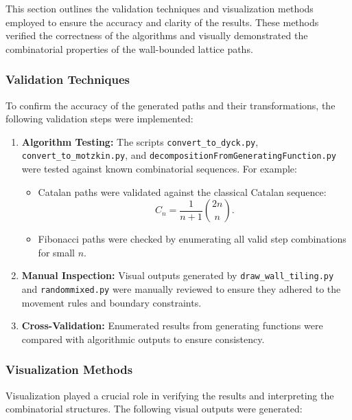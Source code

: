 \documentclass{article}
\begin{document}
This section outlines the validation techniques and visualization methods employed to ensure the accuracy and clarity of the results. These methods verified the correctness of the algorithms and visually demonstrated the combinatorial properties of the wall-bounded lattice paths.

\subsubsection{Validation Techniques}

To confirm the accuracy of the generated paths and their transformations, the following validation steps were implemented:

\begin{enumerate}
    \item \textbf{Algorithm Testing:} 
    The scripts \texttt{convert\_to\_dyck.py}, \texttt{convert\_to\_motzkin.py}, and \texttt{decompositionFromGeneratingFunction.py} were tested against known combinatorial sequences. For example:
    \begin{itemize}
        \item Catalan paths were validated against the classical Catalan sequence:
        \[
        C_n = \frac{1}{n+1} \binom{2n}{n}.
        \]
        \item Fibonacci paths were checked by enumerating all valid step combinations for small \(n\).
    \end{itemize}
    \item \textbf{Manual Inspection:}
    Visual outputs generated by \texttt{draw\_wall\_tiling.py} and \texttt{randommixed.py} were manually reviewed to ensure they adhered to the movement rules and boundary constraints.
    \item \textbf{Cross-Validation:}
    Enumerated results from generating functions were compared with algorithmic outputs to ensure consistency.
\end{enumerate}

\subsubsection{Visualization Methods}

Visualization played a crucial role in verifying the results and interpreting the combinatorial structures. The following visual outputs were generated:
\end{document}
